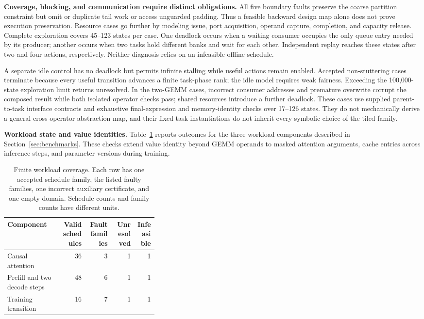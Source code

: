 \documentclass[11pt]{article}
\begin{document}
\textbf{Coverage, blocking, and communication require distinct obligations.}
All five boundary faults preserve the coarse partition constraint but omit or duplicate tail work or access unguarded padding. Thus a feasible backward design map alone does not prove execution preservation. Resource cases go further by modeling issue, port acquisition, operand capture, completion, and capacity release. Complete exploration covers 45--123 states per case. One deadlock occurs when a waiting consumer occupies the only queue entry needed by its producer; another occurs when two tasks hold different banks and wait for each other. Independent replay reaches these states after two and four actions, respectively. Neither diagnosis relies on an infeasible offline schedule.

A separate idle control has no deadlock but permits infinite stalling while useful actions remain enabled. Accepted non-stuttering cases terminate because every useful transition advances a finite task-phase rank; the idle model requires weak fairness. Exceeding the 100,000-state exploration limit returns unresolved. In the two-GEMM cases, incorrect consumer addresses and premature overwrite corrupt the composed result while both isolated operator checks pass; shared resources introduce a further deadlock. These cases use supplied parent-to-task interface contracts and exhaustive final-expression and memory-identity checks over 17--126 states. They do not mechanically derive a general cross-operator abstraction map, and their fixed task instantiations do not inherit every symbolic choice of the tiled family.

\textbf{Workload state and value identities.}\label{sec:workload-pilots}
Table~\ref{tab:workload-results} reports outcomes for the three workload components described in Section~\ref{sec:benchmarks}. These checks extend value identity beyond GEMM operands to masked attention arguments, cache entries across inference steps, and parameter versions during training.

\begin{table}[ht]
\centering\small
\begin{tabular}{p{0.36\linewidth}rrrr}
\toprule
Component & Valid schedules & Fault families & Unresolved & Infeasible \\
\midrule
Causal attention & 36 & 3 & 1 & 1 \\
Prefill and two decode steps & 48 & 6 & 1 & 1 \\
Training transition & 16 & 7 & 1 & 1 \\
\bottomrule
\end{tabular}
\caption{Finite workload coverage. Each row has one accepted schedule family, the listed faulty families, one incorrect auxiliary certificate, and one empty domain. Schedule counts and family counts have different units.}\label{tab:workload-results}
\end{table}
\end{document}
